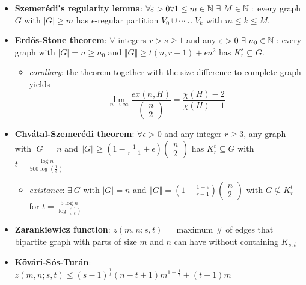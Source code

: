 \begin{itemize}
  \item \textbf{Szemerédi's regularity lemma}: $ \forall \epsilon > 0 \forall 1 \leq m \in \N \ \exists \ M \in \N : $ every graph $ G $ with $ \vert G \vert \geq m $ has $ \epsilon $-regular partition $ V_0 \dot{\cup} \cdots \dot{\cup} V_k $ with $ m \leq k \leq M $.
  \item \textbf{Erd\H{o}s-Stone theorem}: $ \forall $ integers $ r > s \geq 1 $ and any $ \varepsilon > 0 \ \exists \ n_0 \in \mathbb{N} : $ every graph with $ \vert G \vert = n \geq n_0 $ and $ \Vert G \Vert \geq t(n,r-1) + \epsilon n^2 $ has $ K_r^s \subseteq G $.
  \begin{itemize}
    \item \emph{corollary}: the theorem together with the size difference to complete graph yields
    \begin{equation*}
       \lim_{n \to \infty} \frac{ex(n,H)}{\left( \begin{smallmatrix}
         n \\ 2
       \end{smallmatrix} \right)} = \frac{\chi(H) - 2}{\chi(H) - 1}
     \end{equation*} 
  \end{itemize}
  \item \textbf{Chvátal-Szemerédi theorem}: $ \forall \epsilon > 0 $ and any integer $ r \geq 3 $, any graph with $ \vert G \vert = n $ and $ \Vert G \Vert \geq (1-\frac{1}{r-1} + \epsilon)\left( \begin{smallmatrix}
    n \\2
  \end{smallmatrix} \right) $ has $ K_r^t \subseteq G $ with $ t = \frac{\log n}{500\log\left(\frac{1}{\epsilon}\right)} $
  \begin{itemize}
    \item \emph{existance}: $ \exists \ G $ with $ \vert G \vert = n $ and $ \Vert G \Vert = (1-\frac{1+\epsilon}{r-1})\left( \begin{smallmatrix}
      n \\ 2
    \end{smallmatrix} \right) $ with $ G \not \subseteq K_r^t $ for $ t = \frac{5\log n}{\log\left( \frac{1}{\epsilon} \right)} $
  \end{itemize}
  \item \textbf{Zarankiewicz function}: $ z(m,n;s,t) = $ maximum \# of edges that bipartite graph with parts of size $ m $ and $ n $ can have without containing $ K_{s,t} $
  \item \textbf{K\H{o}vári-Sós-Turán}: $ z(m,n;s,t) \leq (s-1)^{\frac{1}{t}}(n-t+1)m^ {1-\frac{1}{t}}+(t-1)m $

\end{itemize}
